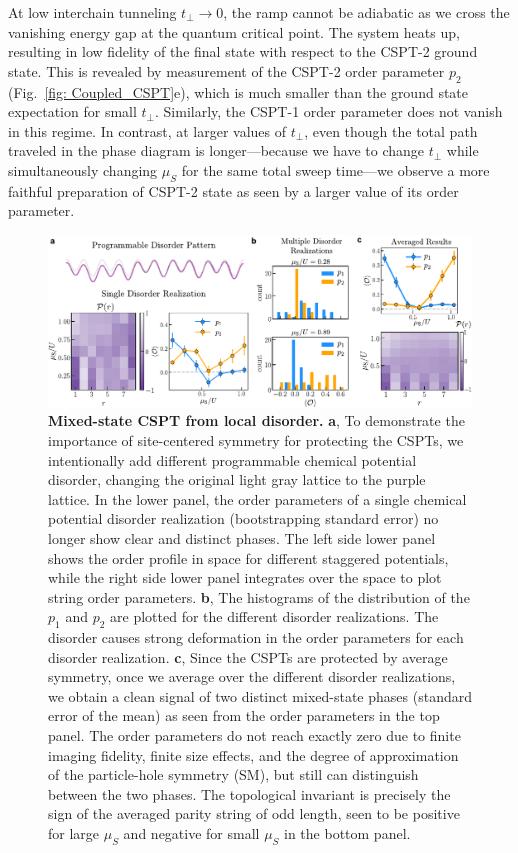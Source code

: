 \documentclass[preprint,superscriptaddress,floatfix, nofootinbib]{revtex4-2}
\begin{document}
At low interchain tunneling $t_\perp \rightarrow 0$, the ramp cannot be adiabatic as we cross the vanishing energy gap at the quantum critical point. The system heats up, resulting in low fidelity of the final state with respect to the CSPT-2 ground state.
%
This is revealed by measurement of the CSPT-2 order parameter $p_2$ (Fig.~\ref{fig: Coupled_CSPT}e), which is much smaller than the ground state expectation for small $t_{\perp}$.
%
Similarly, the CSPT-1 order parameter does not vanish in this regime. In contrast, at larger values of $t_\perp$, even though the total path traveled in the phase diagram is longer---because we have to change $t_\perp$ while simultaneously changing $\mu_S$ for the same total sweep time---we observe a more faithful preparation of CSPT-2 state as seen by a larger value of its order parameter.
%
\begin{figure}
    \centering
    \includegraphics[width=\textwidth]{figures/CSPT_average.pdf}
    \caption{\textbf{Mixed-state CSPT from local disorder.} \textbf{a}, To demonstrate the importance of site-centered symmetry for protecting the CSPTs, we intentionally add different programmable chemical potential disorder, changing the original light gray lattice to the purple lattice. In the lower panel, the order parameters of a single chemical potential disorder realization (bootstrapping standard error) no longer show clear and distinct phases. The left side lower panel shows the order profile in space for different staggered potentials, while the right side lower panel integrates over the space to plot string order parameters. \textbf{b}, The histograms of the distribution of the $p_1$ and $p_2$ are plotted for the different disorder realizations. The disorder causes strong deformation in the order parameters for each disorder realization. \textbf{c}, Since the CSPTs are protected by average symmetry, once we average over the different disorder realizations, we obtain a clean signal of two distinct mixed-state phases (standard error of the mean) as seen from the order parameters in the top panel.
    The order parameters do not reach exactly zero due to finite imaging fidelity, finite size effects, and the degree of approximation of the particle-hole symmetry (SM), but still can distinguish between the two phases.
    The topological invariant is precisely the sign of the averaged parity string of odd length, seen to be positive for large $\mu_S$ and negative for small $\mu_S$ in the bottom panel.}
    \label{fig: CSPT_average}
\end{figure}
\end{document}
